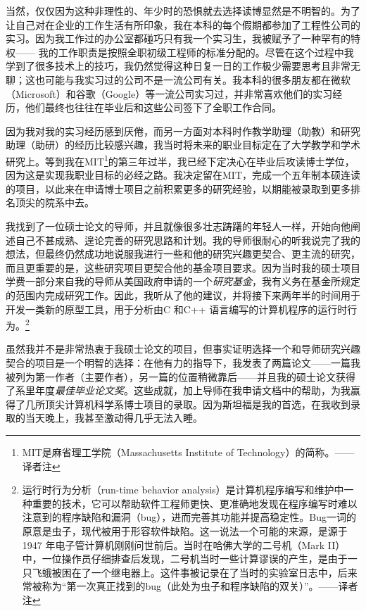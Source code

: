 \documentclass[letter,12pt]{book}
\begin{document}
\begin{CJK}{UTF8}{gbsn}
当然，仅仅因为这种非理性的、年少时的恐惧就去选择读博显然是不明智的。为了让自己对在企业的工作生活有所印象，我在本科的每个假期都参加了工程性公司的实习。因为我工作过的办公室都碰巧只有我一个实习生，我被赋予了一种罕有的特权—— 我的工作职责是按照全职初级工程师的标准分配的。尽管在这个过程中我学到了很多技术上的技巧，我仍然觉得这种日复一日的工作极少需要思考且非常无聊；这也可能与我实习过的公司不是一流公司有关。我本科的很多朋友都在微软（Microsoft）和谷歌（Google）等一流公司实习过，并非常喜欢他们的实习经历，他们最终也往往在毕业后和这些公司签下了全职工作合同。

因为我对我的实习经历感到厌倦，而另一方面对本科时作教学助理（助教）和研究助理（助研）的经历比较感兴趣，我当时将未来的职业目标定在了大学教学和学术研究上。等到我在MIT\footnote{MIT是麻省理工学院（Massachusetts Institute of Technology）的简称。——译者注}的第三年过半，我已经下定决心在毕业后攻读博士学位，因为这是实现我职业目标的必经之路。我决定留在MIT，完成一个五年制本硕连读的项目，以此来在申请博士项目之前积累更多的研究经验，以期能被录取到更多排名顶尖的院系中去。

我找到了一位硕士论文的导师，并且就像很多壮志踌躇的年轻人一样，开始向他阐述自己不甚成熟、遑论完善的研究思路和计划。我的导师很耐心的听我说完了我的想法，但最终仍然成功地说服我进行一些和他的研究兴趣更契合、更主流的研究，而且更重要的是，这些研究项目更契合他的基金项目要求。因为当时我的硕士项目学费一部分来自我的导师从美国政府申请的一个\emph{研究基金}，我有义务在基金所规定的范围内完成研究工作。因此，我听从了他的建议，并将接下来两年半的时间用于开发一类新的原型工具，用于分析由C 和C++ 语言编写的计算机程序的运行时行为。\footnote{运行时行为分析（run-time behavior analysis）是计算机程序编写和维护中一种重要的技术，它可以帮助软件工程师更快、更准确地发现在程序编写时难以注意到的程序缺陷和漏洞（bug），进而完善其功能并提高稳定性。Bug一词的原意是虫子，现代被用于形容软件缺陷。这一说法一个可能的来源，是源于1947 年电子管计算机刚刚问世前后。当时在哈佛大学的二号机（Mark II）中，一位操作员仔细排查后发现，二号机当时一些计算谬误的产生，是由于一只飞蛾被困在了一个继电器上。这件事被记录在了当时的实验室日志中，后来常被称为“第一次真正找到的bug（此处为虫子和程序缺陷的双关）”。——译者注}

虽然我并不是非常热衷于我硕士论文的项目，但事实证明选择一个和导师研究兴趣契合的项目是一个明智的选择：在他有力的指导下，我发表了两篇论文——一篇我被列为第一作者（主要作者），另一篇的位置稍微靠后——并且我的硕士论文获得了系里年度\emph{最佳毕业论文奖}。这些成就，加上导师在我申请文档中的帮助，为我赢得了几所顶尖计算机科学系博士项目的录取。因为斯坦福是我的首选，在我收到录取的当天晚上，我甚至激动得几乎无法入睡。


\end{CJK}
\end{document}
